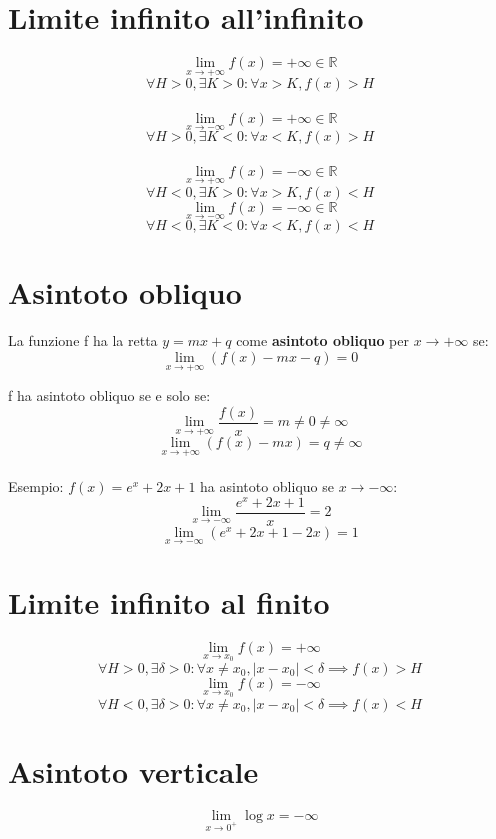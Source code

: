 \documentclass{article}
\begin{document}
\section{Limite infinito all'infinito}
\[\lim_{x \to +\infty} f(x) = +\infty \in \mathbb{R}\]
\[\forall H > 0, \exists K > 0 : \forall x > K, f(x) > H\]\\
\[\lim_{x \to -\infty} f(x) = +\infty \in \mathbb{R}\]
\[\forall H > 0, \exists K < 0 : \forall x < K, f(x) > H\] \\
\[\lim_{x \to +\infty} f(x) = -\infty \in \mathbb{R}\]
\[\forall H < 0, \exists K > 0 : \forall x > K, f(x) < H\]
\[\lim_{x \to -\infty} f(x) = -\infty \in \mathbb{R}\]
\[\forall H < 0, \exists K < 0 : \forall x < K, f(x) < H\]

\section{Asintoto obliquo}
La funzione f ha la retta \(y = mx + q\) come \textbf{asintoto obliquo} per \(x \to +\infty\) se:
\[\lim_{x \to +\infty} (f(x) - mx - q) = 0\]

f ha asintoto obliquo se e solo se:
\[\lim_{x \to +\infty} \frac{f(x)}{x} = m \neq 0 \neq \infty\]
\[\lim_{x \to +\infty} (f(x) - mx) = q \neq \infty\]
\\
Esempio:
\(f(x) = e^x + 2x + 1\) ha asintoto obliquo se \(x \to -\infty\):\\
\[\lim_{x \to -\infty} \frac{e^x + 2x + 1}{x} = 2\]
\[\lim_{x \to -\infty} (e^x + 2x + 1 - 2x) = 1\]

\section{Limite infinito al finito}
\[\lim_{x \to x_0} f(x) = +\infty\]
\[\forall H > 0, \exists \delta > 0 : \forall x \neq x_0, | x - x_0 | < \delta \implies f(x) > H\]
\[\lim_{x \to x_0} f(x) = -\infty\]
\[\forall H < 0, \exists \delta > 0 : \forall x \neq x_0, | x - x_0 | < \delta \implies f(x) < H\]

\section{Asintoto verticale}
\[\lim_{x \to 0^+} \log x = -\infty\]
\end{document}
